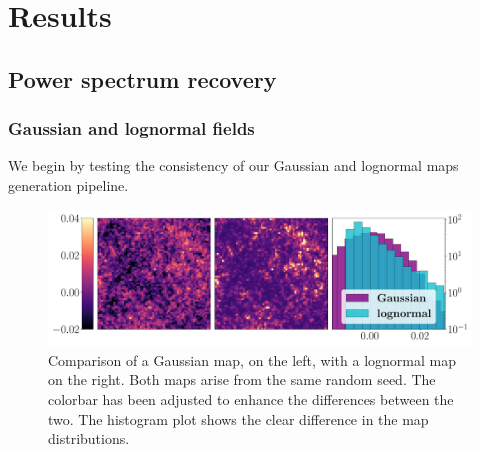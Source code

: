 \chapter{Results}

\section{Power spectrum recovery}
\subsection{Gaussian and lognormal fields}
\label{sec:gaussian and lognormal fields}
We begin by testing the consistency of our Gaussian and lognormal maps generation pipeline. 
\begin{figure}[h]
    \centering
    \includegraphics[width=1\textwidth]{images/4_Gaussian_lognormal_dist.pdf}
    \caption{\label{fig:fields dist} Comparison of a Gaussian map, on the left, with a lognormal map on the right. Both maps arise from the same random seed. The colorbar has been adjusted to enhance the differences between the two. The histogram plot shows the clear difference in the map distributions.}
\end{figure}

